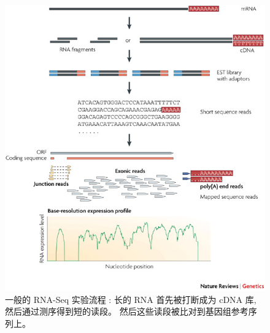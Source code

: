 \begin{figure}[!t]
\centering
\includegraphics[width=\textwidth]{figures/rna-seq-experiment.jpg}
\caption[一般的 RNA-Seq 实验流程 \cite{wang2009rna}]{一般的 RNA-Seq 实验流程 \cite{wang2009rna}: 
长的 RNA 首先被打断成为 cDNA 库, 然后通过测序得到短的读段。
然后这些读段被比对到基因组参考序列上。}
\label{intro-rna-seq-ex}
\end{figure}

